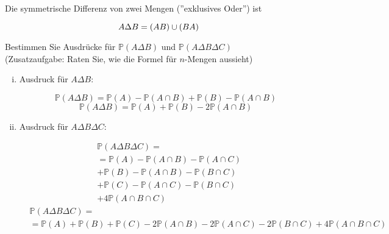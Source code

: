 \begin{uebsp}
\begin{Exercise}[label=ex:1.5]
Die symmetrische Differenz von zwei Mengen (''exklusives Oder'') ist

\[A\Delta B=(A\\B)\cup (B\\A)\]

Bestimmen Sie Ausdrücke für $\mathbb{P}(A\Delta B)$ und $\mathbb{P}(A\Delta B\Delta C)$\\

(Zusatzaufgabe: Raten Sie, wie die Formel für $n$-Mengen aussieht)
\end{Exercise}
\begin{Answer}
    \begin{enumerate}[i)]
        \item Ausdruck für $A\Delta B$:
            \begin{multicols}{2}
                \[\mathbb{P}(A\Delta B)=\mathbb{P}(A)-\mathbb{P}(A\cap B)+\mathbb{P}(B)-\mathbb{P}(A\cap B)\]
                \[\mathbb{P}(A\Delta B)=\mathbb{P}(A)+\mathbb{P}(B)-2\mathbb{P}(A\cap B)\]
                \columnbreak

                \begin{tikzpicture}
                
                \end{tikzpicture}
            \end{multicols}
        \item Ausdruck für $A\Delta B\Delta C$:
            \begin{multicols}{2}
            \begin{align*}  &\mathbb{P}(A\Delta B\Delta C)=\\
                            &=\mathbb{P}(A)-\mathbb{P}(A\cap B)-\mathbb{P}(A\cap C)\\
                            &+\mathbb{P}(B)-\mathbb{P}(A\cap B)-\mathbb{P}(B\cap C)\\
                            &+\mathbb{P}(C)-\mathbb{P}(A\cap C)-\mathbb{P}(B\cap C)\\
                            &+4\mathbb{P}(A\cap B\cap C)\end{align*}
            \begin{align*}&\mathbb{P}(A\Delta B\Delta C)=\\&=\mathbb{P}(A)+\mathbb{P}(B)+\mathbb{P}(C)-2\mathbb{P}(A\cap B)-2\mathbb{P}(A\cap C)-2\mathbb{P}(B\cap C)+4\mathbb{P}(A\cap B\cap C)\end{align*}
                \columnbreak


\end{multicols}
\end{enumerate}
\end{Answer}
\end{uebsp}
